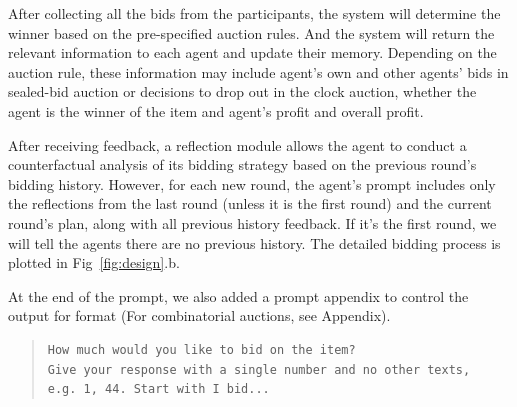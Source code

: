 \documentclass{article} %
\begin{document}
After collecting all the bids from the participants, the system will determine the winner based on the pre-specified auction rules. 
And the system will return the relevant information to each agent and update their memory. 
Depending on the auction rule, these information may include agent's own and other agents' bids in sealed-bid auction or decisions to drop out in the clock auction, whether the agent is the winner of the item and agent's profit and overall profit.

After receiving feedback, a reflection module allows the agent to conduct a counterfactual analysis of its bidding strategy based on the previous round's bidding history.
However, for each new round, the agent's prompt includes only the reflections from the last round (unless it is the first round) and the current round's plan, along with all previous history feedback. 
If it's the first round, we will tell the agents there are no previous history. 
The detailed bidding process is plotted in Fig~\ref{fig:design}.b.

At the end of the prompt, we also added a prompt appendix to control the output for format (For combinatorial auctions, see Appendix).

\begin{quote}
\begin{lstlisting}[basicstyle=\ttfamily]
How much would you like to bid on the item? 
Give your response with a single number and no other texts,
e.g. 1, 44. Start with I bid...
\end{lstlisting}
\end{quote}




\end{document}
